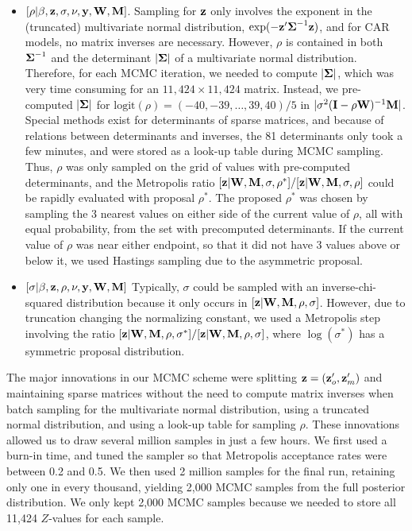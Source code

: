 \documentclass[11pt, titlepage]{article}
\begin{document}
\begin{spacing}{1.9}
\begin{flushleft}
\begin{itemize}
  \item $[\rho|\beta,\mathbf{z},\sigma,\nu,\mathbf{y},\mathbf{W},\mathbf{M}]$. Sampling for $\mathbf{z}$ only involves the exponent in the (truncated) multivariate normal distribution, $\exp(-\mathbf{z}^{\prime}\mbox{\boldmath $\Sigma$}^{-1}\mathbf{z})$, and for CAR models, no matrix inverses are necessary.  However, $\rho$ is contained in both $\mbox{\boldmath $\Sigma$}^{-1}$ and the determinant $|\mbox{\boldmath $\Sigma$}|$ of a multivariate normal distribution.  Therefore, for each MCMC iteration, we needed to compute $|\mbox{\boldmath $\Sigma$}|$, which was very time consuming for an $11,424 \times 11,424$ matrix.  Instead, we pre-computed $|\mbox{\boldmath $\Sigma$}|$ for $\textrm{logit}(\rho) = (-40, -39, \ldots, 39, 40)/5$ in $|\sigma^{2}(\mathbf{I} - \rho\mathbf{W})^{-1}\mathbf{M}|$.  Special methods exist for determinants of sparse matrices, and because of relations between determinants and inverses, the 81 determinants only took a few minutes, and were stored as a look-up table during MCMC sampling.  Thus, $\rho$ was only sampled on the grid of values with pre-computed determinants, and the Metropolis ratio $[\mathbf{z}|\mathbf{W},\mathbf{M},\sigma,\rho^{*}]/[\mathbf{z}|\mathbf{W},\mathbf{M},\sigma,\rho]$ could be rapidly evaluated with proposal $\rho^{*}$.  The proposed $\rho^{*}$ was chosen by sampling the 3 nearest values on either side of the current value of $\rho$, all with equal probability, from the set with precomputed determinants.  If the current value of $\rho$ was near either endpoint, so that it did not have 3 values above or below it, we used Hastings sampling due to the asymmetric proposal.
  \item $[\sigma|\beta,\mathbf{z},\rho,\nu,\mathbf{y},\mathbf{W},\mathbf{M}]$  Typically, $\sigma$ could be sampled with an inverse-chi-squared distribution \citep{gelman_bayesian_2013} because it only occurs in $[\mathbf{z}|\mathbf{W},\mathbf{M},\rho,\sigma]$. However, due to truncation changing the normalizing constant, we used a Metropolis step involving the ratio $[\mathbf{z}|\mathbf{W},\mathbf{M},\rho,\sigma^{*}]/[\mathbf{z}|\mathbf{W},\mathbf{M},\rho,\sigma]$, where $\log(\sigma^{*})$ has a symmetric proposal distribution.   

\end{itemize} 

The major innovations in our MCMC scheme were splitting $\mathbf{z} = (\mathbf{z}_{o}^{\prime},\mathbf{z}_{m}^{\prime})$ and maintaining sparse matrices without the need to compute matrix inverses when batch sampling for the multivariate normal distribution, using a truncated normal distribution, and using a look-up table for sampling $\rho$.  These innovations allowed us to draw several million samples in just a few hours.  We first used a burn-in time, and tuned the sampler so that Metropolis acceptance rates were between 0.2 and 0.5.  We then used 2 million samples for the final run, retaining only one in every thousand, yielding 2,000 MCMC samples from the full posterior distribution.  We only kept 2,000 MCMC samples because we needed to store all 11,424 $Z$-values for each sample.


\end{flushleft}
\end{spacing}
\end{document}
